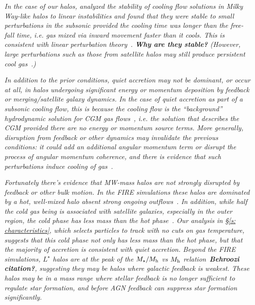 \documentclass[fleqn,usenatbib]{mnras}
\begin{document}
\textit{
In the case of our halos, \cite{Stern2019} analyzed the stability of cooling flow solutions in Milky Way-like halos to linear instabilities and found that they were stable to small perturbations in the subsonic provided the cooling time was longer than the free-fall time, i.e. gas mixed via inward movement faster than it cools.
This is consistent with linear perturbation theory~\citep[e.g.][]{Balbus1989}.
\textbf{Why are they stable?}
(However, large perturbations such as those from satellite halos may still produce persistent cool gas~\citep{Esmerian2020}.)
}

\textit{
In addition to the prior conditions, quiet accretion may not be dominant, or occur at all, in halos undergoing significant energy or momentum deposition by feedback or merging/satellite galaxy dynamics.
In the case of quiet accretion as part of a subsonic cooling flow, this is because the cooling flow is the ``background'' hydrodynamic solution for CGM gas flows~\cite{Stern2019}, i.e. the solution that describes the CGM provided there are no energy or momentum source terms.
More generally, disruption from feedback or other dynamics may invalidate the previous conditions: it could add an additional angular momentum term or disrupt the process of angular momentum coherence, and there is evidence that such perturbations induce cooling of gas~\citep[e.g.][]{Hummels2019, Esmerian2020}.
}

\textit{
Fortunately there's evidence that MW-mass halos are not strongly disrupted by feedback or other bulk motion.
In the FIRE simulations these halos are dominated by a hot, well-mixed halo absent strong ongoing outflows~\citep{Hafen2019}.
In addition, while half the cold gas being is associated with satellite galaxies, especially in the outer region, the cold phase has less mass than the hot phase~\citep{Hafen2020}.
Our analysis in \S\ref{s: characteristics}, which selects particles to track with no cuts on gas temperature, suggests that this cold phase not only has less mass than the hot phase, but that the majority of accretion is consistent with quiet accretion.
Beyond the FIRE simulations, $L^\star$ halos are at the peak of the $M_\star/M_{\rm h}$ vs $M_{\rm h}$ relation~\textbf{Behroozi citation?}, suggesting they may be halos where galactic feedback is weakest.
These halos may be in a mass range where stellar feedback is no longer sufficient to regulate star formation, and before AGN feedback can suppress star formation significantly.
}
\end{document}
